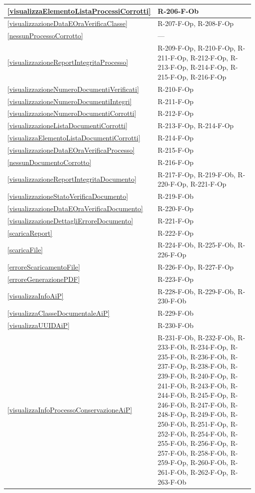\begin{longtable}{|p{4cm}|p{10cm}|}
\hline
\ref{visualizzaElementoListaProcessiCorrotti} & R-206-F-Ob \\
\hline
\ref{visualizzazioneDataEOraVerificaClasse} & R-207-F-Op, R-208-F-Op \\
\hline
\ref{nessunProcessoCorrotto} & --- \\
\hline
\ref{visualizzazioneReportIntegritaProcesso} & R-209-F-Op, R-210-F-Op, R-211-F-Op, R-212-F-Op, R-213-F-Op, R-214-F-Op, R-215-F-Op, R-216-F-Op \\
\hline
\ref{visualizzazioneNumeroDocumentiVerificati} & R-210-F-Op \\
\hline
\ref{visualizzazioneNumeroDocumentiIntegri} & R-211-F-Op \\
\hline
\ref{visualizzazioneNumeroDocumentiCorrotti} & R-212-F-Op \\
\hline
\ref{visualizzazioneListaDocumentiCorrotti} & R-213-F-Op, R-214-F-Op \\
\hline
\ref{visualizzaElementoListaDocumentiCorrotti} & R-214-F-Op \\
\hline
\ref{visualizzazioneDataEOraVerificaProcesso} & R-215-F-Op \\
\hline
\ref{nessunDocumentoCorrotto} & R-216-F-Op \\
\hline
\ref{visualizzazioneReportIntegritaDocumento} & R-217-F-Op, R-219-F-Ob, R-220-F-Op, R-221-F-Op \\
\hline
\ref{visualizzazioneStatoVerificaDocumento} & R-219-F-Ob \\
\hline
\ref{visualizzazioneDataEOraVerificaDocumento} & R-220-F-Op \\
\hline
\ref{visualizzazioneDettagliErroreDocumento} & R-221-F-Op \\
\hline
\ref{scaricaReport} & R-222-F-Op \\
\hline
\ref{scaricaFile} & R-224-F-Ob, R-225-F-Ob, R-226-F-Op \\
\hline
\ref{erroreScaricamentoFile} & R-226-F-Op, R-227-F-Op \\
\hline
\ref{erroreGenerazionePDF} & R-223-F-Op \\
\hline
\ref{visualizzaInfoAiP} & R-228-F-Ob, R-229-F-Ob, R-230-F-Ob \\
\hline
\ref{visualizzaClasseDocumentaleAiP} & R-229-F-Ob \\
\hline
\ref{visualizzaUUIDAiP} & R-230-F-Ob \\
\hline
\ref{visualizzaInfoProcessoConservazioneAiP} & R-231-F-Ob, R-232-F-Ob, R-233-F-Ob, R-234-F-Op, R-235-F-Ob, R-236-F-Ob, R-237-F-Op, R-238-F-Ob, R-239-F-Ob, R-240-F-Op, R-241-F-Ob, R-243-F-Ob, R-244-F-Ob, R-245-F-Op, R-246-F-Ob, R-247-F-Ob, R-248-F-Op, R-249-F-Ob, R-250-F-Ob, R-251-F-Op, R-252-F-Ob, R-254-F-Ob, R-255-F-Ob, R-256-F-Op, R-257-F-Ob, R-258-F-Ob, R-259-F-Op, R-260-F-Ob, R-261-F-Ob, R-262-F-Op, R-263-F-Ob \\

\end{longtable}
